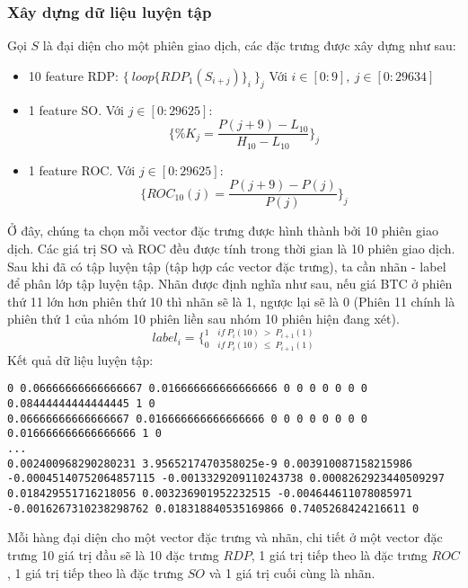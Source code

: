 \subsubsection{Xây dựng dữ liệu luyện tập}
Gọi $S$ là đại diện cho một phiên giao dịch, các đặc trưng được xây dựng như 
sau:
\begin{itemize}
    \item 10 feature RDP: $\{ \: loop\{ RDP_1(S_{i+j})\}_i \: \}_j$ Với 
    $i \in [0:9], \: j \in [0:29634]$
    \item 1 feature SO. Với $ j \in [0:29625] $:\\
    \[
        \{ \%K_j = \frac{P(j+9)-L_{10}}{H_{10}-L_{10}} \}_j
    \]
    \item 1 feature ROC. Với $ j \in [0:29625] $:\\ 
    \[
        \{ ROC_{10}(j)= \frac{P(j+9) - P(j)}{P(j)} \}_j
    \]
\end{itemize}
Ở đây, chúng ta chọn mỗi vector đặc trưng được hình thành bởi 10 phiên giao 
dịch. Các giá trị SO và ROC đều được tính trong thời gian là 10 phiên giao dịch.
Sau khi đã có tập luyện tập (tập hợp các vector đặc trưng), ta cần nhãn - label 
để phân lớp tập luyện tập. Nhãn được định nghĩa như sau, nếu giá BTC ở phiên 
thứ 11 lớn hơn phiên thứ 10 thì nhãn sẽ là 1, ngược lại sẽ là 0 (Phiên 11 chính 
là phiên thứ 1 của nhóm 10 phiên liền sau nhóm 10 phiên hiện đang xét).\\
\[
    label_i = \bigg \{ _{0 \quad if \: P_i(10) \: \leq \: P_{i+1}(1)} ^{1 \quad if \: P_i(10) \: > \: P_{i+1}(1)}
\]
Kết quả dữ liệu luyện tập:
\begin{lstlisting}
0 0.06666666666666667 0.016666666666666666 0 0 0 0 0 0 0 0.08444444444444445 1 0
0.06666666666666667 0.016666666666666666 0 0 0 0 0 0 0 0 0.016666666666666666 1 0
...
0.002400968290280231 3.9565217470358025e-9 0.003910087158215986 -0.00045140752064857115 -0.0013329209110243738 0.0008262923440509297 0.018429551716218056 0.003236901952232515 -0.004644611078085971 -0.0016267310238298762 0.018318840535169866 0.7405268424216611 0
\end{lstlisting}
Mỗi hàng đại diện cho một vector đặc trưng và nhãn, chi tiết ở một vector đặc 
trưng 10 giá trị đầu sẽ là 10 đặc trưng $RDP$, 1 giá trị tiếp theo là đặc trưng 
$ROC$, 1 giá trị tiếp theo là đặc trưng $SO$ và 1 giá trị cuối cùng là nhãn.

